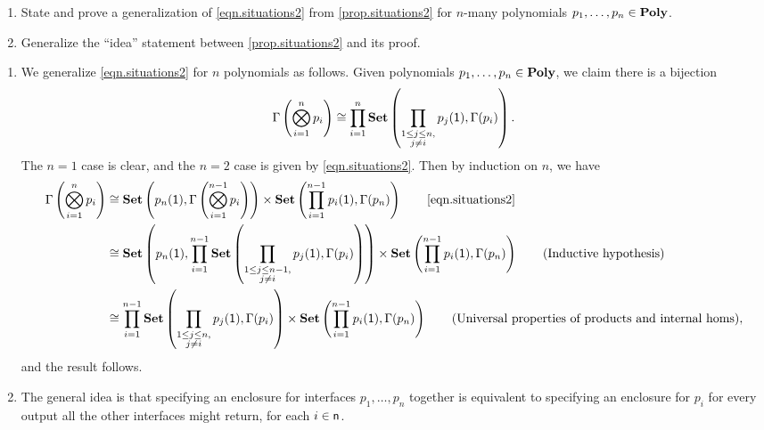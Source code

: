 \documentclass[Book-Poly]{subfiles}
\begin{document}
\begin{exercise}
\begin{enumerate}
	\item State and prove a generalization of \eqref{eqn.situations2} from \cref{prop.situations2} for $n$-many polynomials $p_1,\ldots,p_n\in\mathbf{Poly}$.
	\item Generalize the ``idea'' statement between \cref{prop.situations2} and its proof.
\qedhere
\end{enumerate}
\begin{solution}
\begin{enumerate}
    \item We generalize \eqref{eqn.situations2} for $n$ polynomials as follows.
    Given polynomials $p_1,\ldots,p_n\in\mathbf{Poly}$, we claim there is a bijection
    \[
        \Gamma\left(\bigotimes_{i=1}^n p_i \right) \cong \prod_{i=1}^n \mathbf{Set}\left(\prod_{\substack{1 \leq j \leq n, \\ j \neq i}} p_j(\textsf{1}), \Gamma(p_i)\right).
    \]
    The $n=1$ case is clear, and the $n=2$ case is given by \eqref{eqn.situations2}.
    Then by induction on $n$, we have
    \begin{align*}
        \Gamma\left(\bigotimes_{i=1}^n p_i \right) &\iso \smset\left(p_n(\1), \Gamma\left(\bigotimes_{i=1}^{n-1} p_i \right)\right) \times \smset\left(\prod_{i=1}^{n-1} p_i(\1), \Gamma(p_n)\right) \tag*{\eqref{eqn.situations2}} \\
        &\iso \smset\left(p_n(\1), \prod_{i=1}^{n-1} \smset\left(\prod_{\substack{1 \leq j \leq n-1, \\ j \neq i}} p_j(\1), \Gamma(p_i)\right)\right) \times \smset\left(\prod_{i=1}^{n-1} p_i(\1), \Gamma(p_n)\right) \tag{Inductive hypothesis} \\
        &\iso \prod_{i=1}^{n-1} \smset\left(\prod_{\substack{1 \leq j \leq n, \\ j \neq i}} p_j(\1), \Gamma(p_i)\right) \times \smset\left(\prod_{i=1}^{n-1} p_i(\1), \Gamma(p_n)\right) \tag{Universal properties of products and internal homs},
    \end{align*}
    and the result follows.
    \item The general idea is that specifying an enclosure for interfaces $p_1,\ldots,p_n$ together is equivalent to specifying an enclosure for $p_i$ for every output all the other interfaces might return, for each $i\in\mathsf{n}$.
\end{enumerate}
\end{solution}
\end{exercise}
\end{document}
